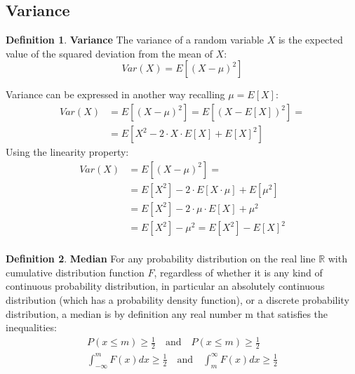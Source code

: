 \documentclass[12pt, letterpaper]{article}
\theoremstyle{definition}
\newtheorem{definition}{Definition}[section]
\newcommand{\R}{\mathbb{R}}
\begin{document}
\subsection{Variance}
\label{Variance}
\begin{definition}{\textbf{Variance}}
The variance of a random variable $X$ is the expected value of the squared deviation from the mean of $X$:
\begin{equation}
Var\left( X\right) = E\left[ \left( X - \mu \right)^2\right] 
\end{equation}

Variance can be expressed in another way recalling $\mu = E\left[ X\right] $:
\begin{align}
	Var\left( X\right) &= E\left[ \left( X - \mu \right)^2\right] = E\left[ \left( X - E\left[ X\right] \right)^2\right] =\\
	&= E\left[ X^2 - 2\cdot X \cdot E\left[ X\right] + E\left[ X\right] ^2\right]
\end{align}
Using the linearity property:
\begin{align}
	Var\left( X\right) &= E\left[ \left( X - \mu \right)^2\right] = \\
	&= E\left[ X^2\right] - 2\cdot E\left[X \cdot \mu \right]+ E\left[\mu^2\right]\\
	&= E\left[ X^2\right] - 2\cdot \mu \cdot E\left[X\right]+\mu^2 \\
	&= E\left[ X^2\right] - \mu^2 = E\left[ X^2\right] - E\left[ X\right] ^2 \\
\end{align}
\end{definition}

\begin{definition}{\textbf{Median}}
For any probability distribution on the real line $\R$ with cumulative distribution function $F$, regardless of whether it is any kind of continuous probability distribution, in particular an absolutely continuous distribution (which has a probability density function), or a discrete probability distribution, a median is by definition any real number m that satisfies the inequalities:
\begin{align}
P(x\le m) \ge \frac{1}{2} \quad \text{and} \quad P(x\le m) \ge \frac{1}{2}\\
\int_{- \infty}^{m} F(x) dx \ge  \frac{1}{2} \quad \text{and} \quad \int_{m}^{\infty} F(x) dx \ge  \frac{1}{2} 
\end{align}

\end{definition}
\end{document}
